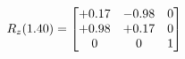 \documentclass[preview]{standalone}
\begin{document}
\begin{align*}
\special{dvisvgm:raw <g id='unique000'>}R_{z}(1.40) = \begin{bmatrix}+0.17 & -0.98 & 0 \\+0.98 & +0.17 & 0 \\0 & 0 & 1\end{bmatrix}\special{dvisvgm:raw </g>}
\end{align*}
\end{document}
